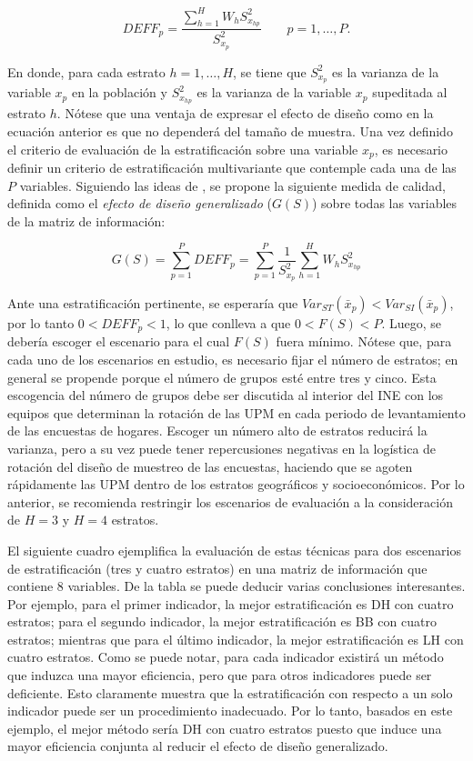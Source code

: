 \documentclass[
  10pt,
  spanish,
]{book}
\begin{document}
\[
DEFF_p = \frac{ \sum_{h=1}^H W_h S^2_{x_{hp}} }{S^2_{x_p}} \ \ \ \ \ \ \ \ \ p = 1, \ldots, P.
\]

En donde, para cada estrato \(h = 1, \ldots, H\), se tiene que \(S^2_{x_p}\) es la varianza de la variable \(x_p\) en la población y \(S^2_{x_{hp}}\) es la varianza de la variable \(x_p\) supeditada al estrato \(h\). Nótese que una ventaja de expresar el efecto de diseño como en la ecuación anterior es que no dependerá del tamaño de muestra. Una vez definido el criterio de evaluación de la estratificación sobre una variable \(x_p\), es necesario definir un criterio de estratificación multivariante que contemple cada una de las \(P\) variables. Siguiendo las ideas de \citet{Jarque_1981}, se propone la siguiente medida de calidad, definida como el \emph{efecto de diseño generalizado} (\(G(S)\)) sobre todas las variables de la matriz de información:

\[
G(S) = \sum_{p=1}^P DEFF_p = \sum_{p=1}^P \frac{1}{S^2_{x_p}}\sum_{h=1}^H W_h S^2_{x_{hp}}
\]

Ante una estratificación pertinente, se esperaría que \(Var_{ST}(\bar x _p) < Var_{SI}(\bar x _p)\), por lo tanto \(0 < DEFF_p < 1\), lo que conlleva a que \(0 < F(S) < P\). Luego, se debería escoger el escenario para el cual \(F(S)\) fuera mínimo. Nótese que, para cada uno de los escenarios en estudio, es necesario fijar el número de estratos; en general se propende porque el número de grupos esté entre tres y cinco. Esta escogencia del número de grupos debe ser discutida al interior del INE con los equipos que determinan la rotación de las UPM en cada periodo de levantamiento de las encuestas de hogares. Escoger un número alto de estratos reducirá la varianza, pero a su vez puede tener repercusiones negativas en la logística de rotación del diseño de muestreo de las encuestas, haciendo que se agoten rápidamente las UPM dentro de los estratos geográficos y socioeconómicos. Por lo anterior, se recomienda restringir los escenarios de evaluación a la consideración de \(H=3\) y \(H=4\) estratos.

El siguiente cuadro ejemplifica la evaluación de estas técnicas para dos escenarios de estratificación (tres y cuatro estratos) en una matriz de información que contiene 8 variables. De la tabla se puede deducir varias conclusiones interesantes. Por ejemplo, para el primer indicador, la mejor estratificación es DH con cuatro estratos; para el segundo indicador, la mejor estratificación es BB con cuatro estratos; mientras que para el último indicador, la mejor estratificación es LH con cuatro estratos. Como se puede notar, para cada indicador existirá un método que induzca una mayor eficiencia, pero que para otros indicadores puede ser deficiente. Esto claramente muestra que la estratificación con respecto a un solo indicador puede ser un procedimiento inadecuado. Por lo tanto, basados en este ejemplo, el mejor método sería DH con cuatro estratos puesto que induce una mayor eficiencia conjunta al reducir el efecto de diseño generalizado.
\end{document}
